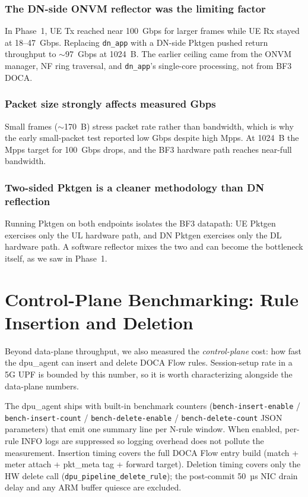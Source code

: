 \documentclass[conference]{IEEEtran}
\newcommand{\code}[1]{\nolinkurl{#1}}
\begin{document}
\subsubsection{The DN-side ONVM reflector was the limiting factor}
In Phase~1, UE Tx reached near 100~Gbps for larger frames while UE
Rx stayed at 18--47~Gbps.  Replacing \code{dn_app} with a DN-side
Pktgen pushed return throughput to $\sim$97~Gbps at 1024~B.  The
earlier ceiling came from the ONVM manager, NF ring traversal, and
\code{dn_app}'s single-core processing, not from BF3 DOCA.

\subsubsection{Packet size strongly affects measured Gbps}
Small frames ($\sim$170~B) stress packet rate rather than bandwidth,
which is why the early small-packet test reported low Gbps despite
high Mpps.  At 1024~B the Mpps target for 100~Gbps drops, and the BF3
hardware path reaches near-full bandwidth.

\subsubsection{Two-sided Pktgen is a cleaner methodology than DN reflection}
Running Pktgen on both endpoints isolates the BF3 datapath: UE Pktgen
exercises only the UL hardware path, and DN Pktgen exercises only the
DL hardware path.  A software reflector mixes the two and can become
the bottleneck itself, as we saw in Phase~1.

\section{Control-Plane Benchmarking: Rule Insertion and Deletion}
\label{sec:bench}

Beyond data-plane throughput, we also measured the
\emph{control-plane} cost: how fast the dpu\_agent can insert
and delete DOCA Flow rules.  Session-setup rate in a 5G UPF is bounded
by this number, so it is worth characterizing alongside the
data-plane numbers.

The dpu\_agent ships with built-in benchmark counters
(\code{bench-insert-enable} / \code{bench-insert-count} /
\code{bench-delete-enable} / \code{bench-delete-count} JSON
parameters) that emit one summary line per N-rule window.  When
enabled, per-rule INFO logs are suppressed so logging overhead does
not pollute the measurement.  Insertion timing covers the full DOCA
Flow entry build (match + meter attach + pkt\_meta tag + forward
target).  Deletion timing covers only the HW delete call
(\code{dpu_pipeline_delete_rule}); the post-commit 50~µs NIC drain
delay and any ARM buffer quiesce are excluded.
\end{document}
